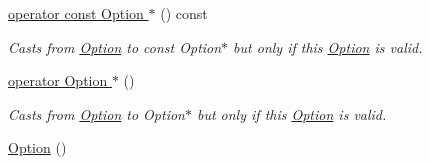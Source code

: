 \begin{DoxyCompactItemize}
\hyperlink{classoption_1_1_option_aaaeedf023bc3f5eee0b199c64d8fe1ec}{operator const Option $\ast$} () const 
\begin{DoxyCompactList}\small\item\em \-Casts from \hyperlink{classoption_1_1_option}{\-Option} to const \-Option$\ast$ but only if this \hyperlink{classoption_1_1_option}{\-Option} is valid. \end{DoxyCompactList}\item 
\hyperlink{classoption_1_1_option_ac5b9235d79208035d97e41fe17ba04d6}{operator Option $\ast$} ()
\begin{DoxyCompactList}\small\item\em \-Casts from \hyperlink{classoption_1_1_option}{\-Option} to \-Option$\ast$ but only if this \hyperlink{classoption_1_1_option}{\-Option} is valid. \end{DoxyCompactList}\item 
\hypertarget{classoption_1_1_option_aa2810152fc23b14175b115d1a7d38095}{\hyperlink{classoption_1_1_option_aa2810152fc23b14175b115d1a7d38095}{\-Option} ()}\label{classoption_1_1_option_aa2810152fc23b14175b115d1a7d38095}


\end{DoxyCompactItemize}
